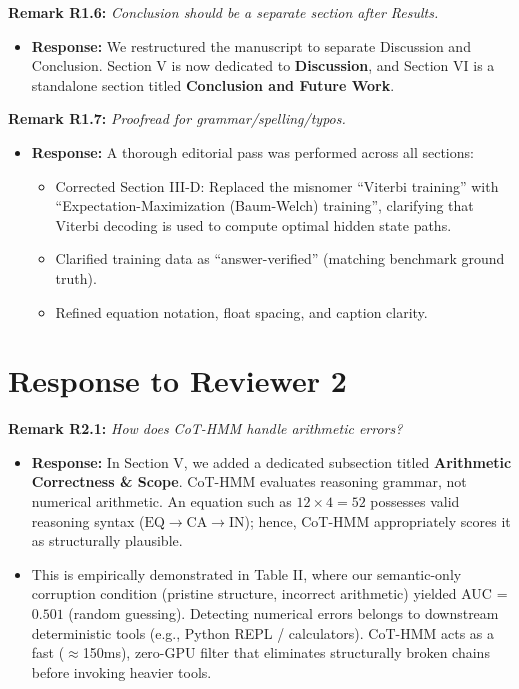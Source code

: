 \documentclass[11pt,a4paper]{article}
\begin{document}
\vspace{6pt}
\noindent\textbf{Remark R1.6:} \textit{Conclusion should be a separate section after Results.}
\begin{itemize}[leftmargin=18pt]
    \item \textbf{Response:} We restructured the manuscript to separate Discussion and Conclusion. Section V is now dedicated to \textbf{Discussion}, and Section VI is a standalone section titled \textbf{Conclusion and Future Work}.
\end{itemize}

\vspace{6pt}
\noindent\textbf{Remark R1.7:} \textit{Proofread for grammar/spelling/typos.}
\begin{itemize}[leftmargin=18pt]
    \item \textbf{Response:} A thorough editorial pass was performed across all sections:
    \begin{itemize}
        \item Corrected Section III-D: Replaced the misnomer ``Viterbi training'' with ``Expectation-Maximization (Baum-Welch) training'', clarifying that Viterbi decoding is used to compute optimal hidden state paths.
        \item Clarified training data as ``answer-verified'' (matching benchmark ground truth).
        \item Refined equation notation, float spacing, and caption clarity.
    \end{itemize}
\end{itemize}

\newpage
\section*{Response to Reviewer 2}

\noindent\textbf{Remark R2.1:} \textit{How does CoT-HMM handle arithmetic errors?}
\begin{itemize}[leftmargin=18pt]
    \item \textbf{Response:} In Section V, we added a dedicated subsection titled \textbf{Arithmetic Correctness \& Scope}. CoT-HMM evaluates reasoning grammar, not numerical arithmetic. An equation such as $12 \times 4 = 52$ possesses valid reasoning syntax ($\text{EQ}\to\text{CA}\to\text{IN}$); hence, CoT-HMM appropriately scores it as structurally plausible.
    \item This is empirically demonstrated in Table II, where our semantic-only corruption condition (pristine structure, incorrect arithmetic) yielded AUC = $0.501$ (random guessing). Detecting numerical errors belongs to downstream deterministic tools (e.g., Python REPL / calculators). CoT-HMM acts as a fast ($\approx$150ms), zero-GPU filter that eliminates structurally broken chains before invoking heavier tools.
\end{itemize}
\end{document}
